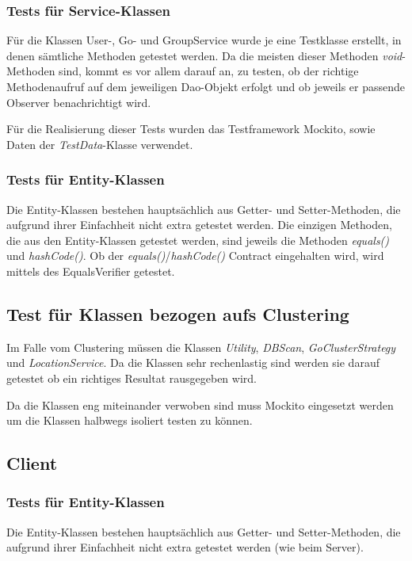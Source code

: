 \documentclass[11pt,a4paper]{scrartcl}
\begin{document}
\subsubsection{Tests für Service-Klassen}
Für die Klassen User-, Go- und GroupService wurde je eine Testklasse erstellt, in denen sämtliche Methoden getestet werden. Da die meisten dieser Methoden \textit{void}-Methoden sind, kommt es vor allem darauf an, zu testen, ob der richtige Methodenaufruf auf dem jeweiligen Dao-Objekt erfolgt und ob jeweils er passende Observer benachrichtigt wird.

Für die Realisierung dieser Tests wurden das Testframework Mockito, sowie Daten der \textit{TestData}-Klasse verwendet.

\subsubsection{Tests für Entity-Klassen}
Die Entity-Klassen bestehen hauptsächlich aus Getter- und Setter-Methoden, die aufgrund ihrer Einfachheit nicht extra getestet werden. Die einzigen Methoden, die aus den Entity-Klassen getestet werden, sind jeweils die Methoden \textit{equals()} und \textit{hashCode()}. Ob der \textit{equals()}/\textit{hashCode()} Contract eingehalten wird, wird mittels des EqualsVerifier getestet.

\subsection{Test für Klassen bezogen aufs Clustering}
Im Falle vom Clustering müssen die Klassen \textit{Utility}, \textit{DBScan}, \textit{GoClusterStrategy} und \textit{LocationService}. Da die Klassen sehr rechenlastig sind werden sie darauf getestet ob ein richtiges Resultat rausgegeben wird.

Da die Klassen eng miteinander verwoben sind muss Mockito eingesetzt werden um die Klassen halbwegs isoliert testen zu können.

\subsection{Client}

\subsubsection{Tests für Entity-Klassen}
Die Entity-Klassen bestehen hauptsächlich aus Getter- und Setter-Methoden, die aufgrund ihrer Einfachheit nicht extra getestet werden (wie beim Server). 
\end{document}
